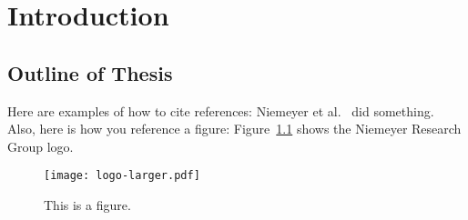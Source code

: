 
\chapter{Introduction}
\label{part:intro}



\blindtext

\section{Outline of Thesis}

Here are examples of how to cite references: Niemeyer et al.~\cite{niemeyer2010,niemeyer2011,niemeyer2014} did something.
Also, here is how you reference a figure: Figure~\ref{fig:logo} shows the Niemeyer Research Group logo.

\begin{figure}[htbp]
\centering
\texttt{[image: logo-larger.pdf]}
\caption{This is a figure.}
\label{fig:logo}
\end{figure}
